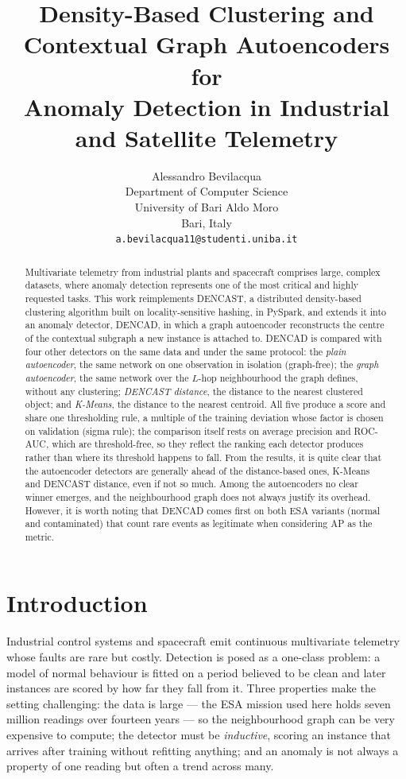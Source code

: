 \documentclass{article}
\title{Density-Based Clustering and Contextual Graph Autoencoders for\\
Anomaly Detection in Industrial and Satellite Telemetry}
\author{
 Alessandro Bevilacqua \\
  Department of Computer Science \\
  University of Bari Aldo Moro \\
  Bari, Italy \\
  \texttt{a.bevilacqua11@studenti.uniba.it} \\
}
\begin{document}
\maketitle

\begin{abstract}
Multivariate telemetry from industrial plants and spacecraft comprises large, 
complex datasets, where anomaly detection represents one of the most critical and highly requested tasks.
This work reimplements DENCAST, a distributed density-based clustering algorithm built on locality-sensitive hashing, 
in PySpark, and
extends it into an anomaly detector, DENCAD, in which a graph autoencoder reconstructs
the centre of the contextual subgraph a new instance is attached to. DENCAD is compared with 
four other detectors on the same data and under the same protocol: 
the \emph{plain autoencoder}, the same network on one observation in isolation (graph-free); 
the \emph{graph autoencoder}, the same network over the $L$-hop neighbourhood the graph defines, without any clustering; 
\emph{DENCAST distance}, the distance to the nearest clustered object; 
and \emph{K-Means}, the distance to the nearest centroid.
All five produce a score and share one thresholding rule, 
a multiple of the training deviation whose factor is chosen on validation (sigma rule); 
the comparison itself rests on average precision and ROC-AUC, which are threshold-free, 
so they reflect the ranking each detector produces rather than where its threshold happens to fall.
From the results, it is quite clear that the autoencoder detectors are generally ahead of the distance-based ones, K-Means and DENCAST distance, even if not so much. 
Among the autoencoders no clear winner emerges, and the neighbourhood graph does not always justify its overhead. 
However, it is worth noting that DENCAD comes first on both ESA variants (normal and contaminated)
that count rare events as legitimate when considering AP as the metric.

\end{abstract}

\section{Introduction}

Industrial control systems and spacecraft emit continuous multivariate telemetry whose
faults are rare but costly. Detection is posed as a one-class problem: a model of normal behaviour is fitted on a period believed to be
clean and later instances are scored by how far they fall from it. Three properties make the setting challenging: 
the data is large --- the ESA mission used here holds seven million readings over fourteen years --- 
so the neighbourhood graph can be very expensive to compute; 
the detector must be \emph{inductive}, scoring an instance that arrives after training without refitting anything; 
and an anomaly is not always a property of one reading but often a trend across many.
\end{document}
